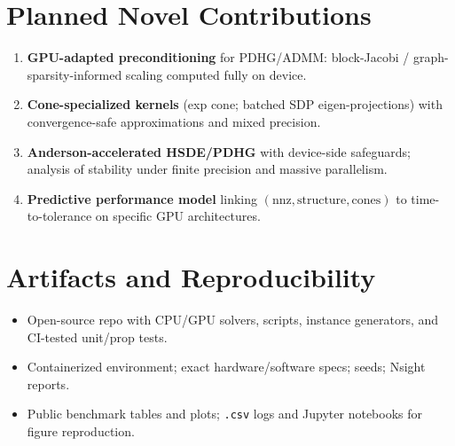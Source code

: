 \documentclass[12pt]{article}
\begin{document}
\section*{Planned Novel Contributions}
\begin{enumerate}
  \item \textbf{GPU-adapted preconditioning} for PDHG/ADMM: block-Jacobi / graph-sparsity-informed scaling computed fully on device.
  \item \textbf{Cone-specialized kernels} (exp cone; batched SDP eigen-projections) with convergence-safe approximations and mixed precision.
  \item \textbf{Anderson-accelerated HSDE/PDHG} with device-side safeguards; analysis of stability under finite precision and massive parallelism.
  \item \textbf{Predictive performance model} linking $(\mathrm{nnz}, \text{structure}, \text{cones})$ to time-to-tolerance on specific GPU architectures.
\end{enumerate}

\section*{Artifacts and Reproducibility}
\begin{itemize}
  \item Open-source repo with CPU/GPU solvers, scripts, instance generators, and CI-tested unit/prop tests.
  \item Containerized environment; exact hardware/software specs; seeds; Nsight reports.
  \item Public benchmark tables and plots; \texttt{.csv} logs and Jupyter notebooks for figure reproduction.
\end{itemize}

\end{document}
